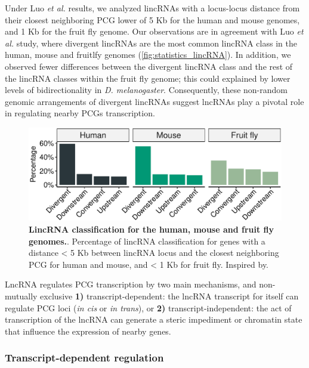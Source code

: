 Under Luo \textit{et al.} results, we analyzed lincRNAs with a locus-locus distance from their closest neighboring PCG lower of 5 Kb for the human and mouse genomes, and 1 Kb for the fruit fly genome. Our observations are in agreement with Luo \textit{et al.} study, where divergent lincRNAs are the most common lincRNA class in the human, mouse and fruitlfy genomes\autocite{luo_2016_divergent} (\autoref{fig:statistics_lincRNA}). In addition, we observed fewer differences between the divergent lincRNA class and the rest of the lincRNA classes within the fruit fly genome; this could explained by lower levels of bidirectionality in \textit{D. melanogaster}.\autocite{core_2012_defining} Consequently, these non-random genomic arrangements of divergent lincRNAs suggest lncRNAs play a pivotal role in regulating nearby PCGs transcription.

\begin{figure}[!htb]
  \centering
  \includegraphics[scale=0.57]{plots/introduction/lincRNA.subtypes.pdf}
  \caption[LincRNA classification for the human, mouse and fruit fly genomes.]{\textbf{LincRNA classification for the human, mouse and fruit fly genomes.}. Percentage of lincRNA classification for genes with a distance < 5 Kb between lincRNA locus and the closest neighboring PCG for human and mouse, and < 1 Kb for fruit fly. Inspired by.\autocite{luo_2016_divergent}}
  \label{fig:statistics_lincRNA}
\end{figure}

LncRNA regulates PCG transcription by two main mechanisms, and non-mutually exclusive \textbf{1)} transcript-dependent: the lncRNA transcript for itself can regulate PCG loci (\textit{in cis} or \textit{in trans}), or \textbf{2)} transcript-independent: the act of transcription of the lncRNA can generate a steric impediment or chromatin state that influence the expression of nearby genes.   

\subsubsection{Transcript-dependent regulation}
\label{subsub-sec:trans-dep-reg}

